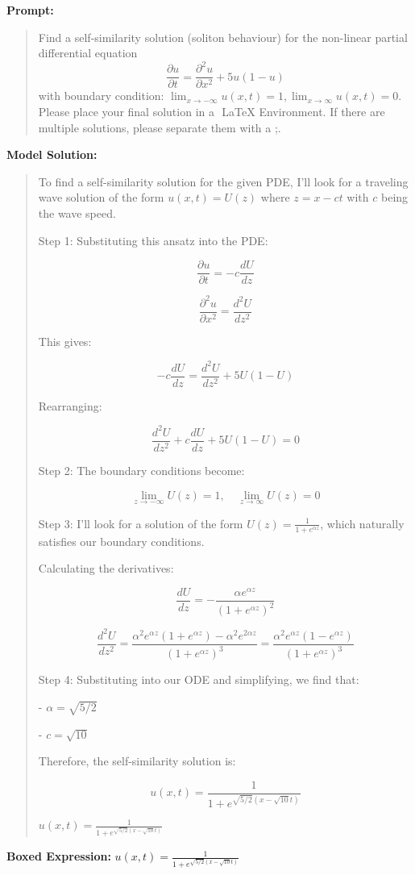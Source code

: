 \documentclass{article}
\begin{document}
\textbf{Prompt:}
\begin{quote}
Find a self-similarity solution (soliton behaviour) for the non-linear partial differential equation $$\frac{\partial u}{\partial t} = \frac{\partial^2 u}{\partial x^2} + 5u(1-u)$$ with boundary condition: $\lim_{x \to -\infty} u(x,t) = 1,\lim_{x \to \infty} u(x,t) = 0$. Please place your final solution in a $\boxed{}$ LaTeX Environment. If there are multiple solutions, please separate them with a ;.
\end{quote}
\textbf{Model Solution:}
\begin{quote}
To find a self-similarity solution for the given PDE, I'll look for a traveling wave solution of the form $u(x,t) = U(z)$ where $z = x - ct$ with $c$ being the wave speed.



Step 1: Substituting this ansatz into the PDE:

$$\frac{\partial u}{\partial t} = -c\frac{dU}{dz}$$

$$\frac{\partial^2 u}{\partial x^2} = \frac{d^2U}{dz^2}$$



This gives:

$$-c\frac{dU}{dz} = \frac{d^2U}{dz^2} + 5U(1-U)$$



Rearranging:

$$\frac{d^2U}{dz^2} + c\frac{dU}{dz} + 5U(1-U) = 0$$



Step 2: The boundary conditions become:

$$\lim_{z \to -\infty} U(z) = 1, \quad \lim_{z \to \infty} U(z) = 0$$



Step 3: I'll look for a solution of the form $U(z) = \frac{1}{1+e^{\alpha z}}$, which naturally satisfies our boundary conditions.



Calculating the derivatives:

$$\frac{dU}{dz} = -\frac{\alpha e^{\alpha z}}{(1+e^{\alpha z})^2}$$

$$\frac{d^2U}{dz^2} = \frac{\alpha^2 e^{\alpha z}(1+e^{\alpha z}) - \alpha^2 e^{2\alpha z}}{(1+e^{\alpha z})^3} = \frac{\alpha^2 e^{\alpha z}(1-e^{\alpha z})}{(1+e^{\alpha z})^3}$$



Step 4: Substituting into our ODE and simplifying, we find that:

- $\alpha = \sqrt{5/2}$

- $c = \sqrt{10}$



Therefore, the self-similarity solution is:



$$u(x,t) = \frac{1}{1+e^{\sqrt{5/2}(x-\sqrt{10}t)}}$$



$\boxed{u(x,t) = \frac{1}{1+e^{\sqrt{5/2}(x-\sqrt{10}t)}}}$
\end{quote}
\textbf{Boxed Expression:} $u(x,t) = \frac{1}{1+e^{\sqrt{5/2}(x-\sqrt{10}t)}}$
\end{document}
